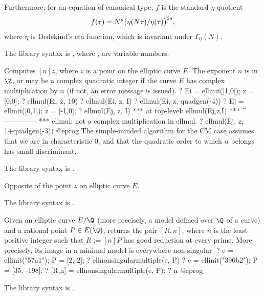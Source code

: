\noindent Furthermore, for an equation of canonical type, $f$ is the standard
$\eta$-quotient
$$f(\tau) = N^s \* \big(\eta(N\*\tau) / \eta(\tau) \big)^{2\*s},$$
where $\eta$ is Dedekind's eta function, which is invariant under
$\Gamma_0(N)$.

The library syntax is , where ,  are variable numbers.

\label{se:ellmul}
Computes $[n]z$, where $z$ is a point on the elliptic curve $E$. The
exponent $n$ is in $\Z$, or may be a complex quadratic integer if the curve $E$
has complex multiplication by $n$ (if not, an error message is issued).
\bprog
? Ei = ellinit([1,0]); z = [0,0];
? ellmul(Ei, z, 10)
? ellmul(Ei, z, I)
? ellmul(Ei, z, quadgen(-4))
? Ej  = ellinit([0,1]); z = [-1,0];
? ellmul(Ej, z, I)
  ***   at top-level: ellmul(Ej,z,I)
  ***                 ^--------------
  *** ellmul: not a complex multiplication in ellmul.
? ellmul(Ej, z, 1+quadgen(-3))
@eprog
The simple-minded algorithm for the CM case assumes that we are in
characteristic $0$, and that the quadratic order to which $n$ belongs has
small discriminant.

The library syntax is .

\label{se:ellneg}
Opposite of the point $z$ on elliptic curve $E$.

The library syntax is .

\label{se:ellnonsingularmultiple}
Given an elliptic curve $E/\Q$ (more precisely, a model defined over $\Q$
of a curve) and a rational point $P \in E(\Q)$, returns the pair $[R,n]$,
where $n$ is the least positive integer such that $R := [n]P$ has good
reduction at every prime. More precisely, its image in a minimal model is
everywhere non-singular.
\bprog
? e = ellinit("57a1"); P = [2,-2];
? ellnonsingularmultiple(e, P)
? e = ellinit("396b2"); P = [35, -198];
? [R,n] = ellnonsingularmultiple(e, P);
? n
@eprog

The library syntax is .


